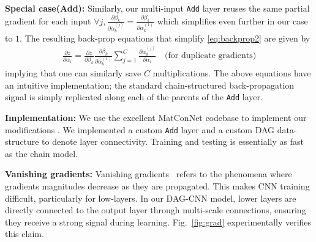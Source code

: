 \documentclass[10pt,twocolumn,letterpaper]{article}
\begin{document}
{\bf Special case(Add):} Similarly, our multi-input {\tt Add} layer reuses the same partial gradient for each input
$\forall j, \frac{\partial \beta_k}{\partial \alpha_k^{(j)}} = \frac{\partial \beta_k}{\partial \alpha_k^{(1)}}$ which simplifies even further in our case to $1$. The resulting back-prop equations that simplify \eqref{eq:backprop2} are given by
\begin{align}
\frac{\partial z}{\partial \alpha_i} = \frac{\partial z}{\partial \beta_k} \frac{\partial \beta_k}{\partial \alpha_k^{(1)}}\sum_{j=1}^{C} \frac{\partial \alpha_k^{(j)}}{\partial \alpha_i}  \quad \text{(for duplicate gradients)}
\end{align}
\noindent implying that one can similarly save $C$ multiplications. The above equations have an intuitive implementation; the standard chain-structured back-propagation signal is simply replicated along each of the parents of the {\tt Add} layer.

{\bf Implementation:} We use the excellent MatConNet codebase to implement our modifications \cite{vedaldimatconvnet}. We implemented a custom {\tt Add} layer and a custom DAG data-structure to denote layer connectivity. Training and testing is essentially as fast as the chain model.

{\bf Vanishing gradients:} Vanishing gradients~\cite{bengio1994learning} refers to the phenomena where gradients magnitudes decrease as they are propagated. This makes CNN training difficult, particularly for low-layers. In our DAG-CNN model, lower layers are directly connected to the output layer through multi-scale connections, ensuring they receive a strong signal during learning. Fig.~\ref{fig:grad} experimentally verifies this claim.%
\end{document}
